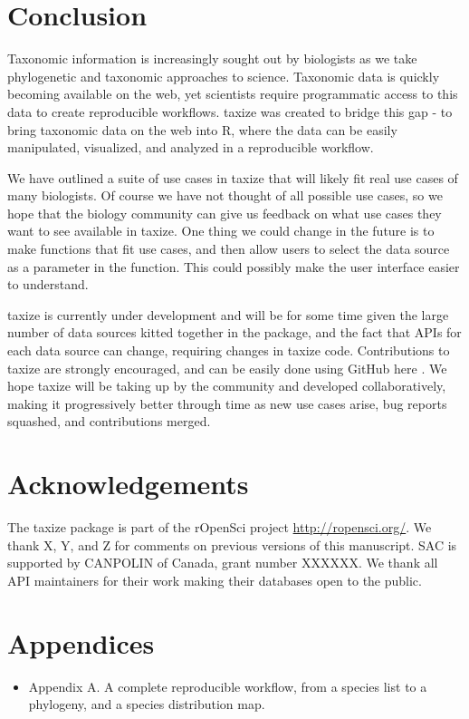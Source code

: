 \documentclass[letterpaper,superscriptaddress,showkeys,longbibliography,10pt]{revtex4-1}\usepackage{graphicx, color}
\begin{document}
\section{Conclusion}

Taxonomic information is increasingly sought out by biologists as we take phylogenetic and taxonomic approaches to science. Taxonomic data is quickly becoming available on the web, yet scientists require programmatic access to this data to create reproducible workflows. taxize was created to bridge this gap - to bring taxonomic data on the web into R, where the data can be easily manipulated, visualized, and analyzed in a reproducible workflow.

We have outlined a suite of use cases in taxize that will likely fit real use cases of many biologists. Of course we have not thought of all possible use cases, so we hope that the biology community can give us feedback on what use cases they want to see available in taxize. One thing we could change in the future is to make  functions that fit use cases, and then allow users to select the data source as a parameter in the function. This could possibly make the user interface easier to understand.

taxize is currently under development and will be for some time given the large number of data sources kitted together in the package, and the fact that APIs for each data source can change, requiring changes in taxize code. Contributions to taxize are strongly encouraged, and can be easily done using GitHub here \cite{github_taxize}. We hope taxize will be taking up by the community and developed collaboratively, making it progressively better through time as new use cases arise, bug reports squashed, and contributions merged.


\section{Acknowledgements}

The taxize package is part of the rOpenSci project \url{http://ropensci.org/}. We thank X, Y, and Z for comments on previous versions of this manuscript. SAC is supported by CANPOLIN of Canada, grant number XXXXXX. We thank all API maintainers for their work making their databases open to the public.

\section{Appendices}

\begin{itemize}
    \item{Appendix A.} A complete reproducible workflow, from a species list to a phylogeny, and a species distribution map. 
\end{itemize}



\end{document}
